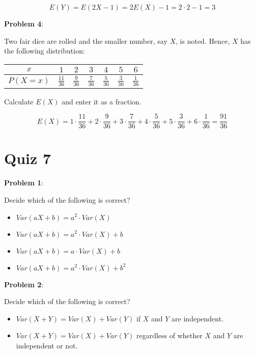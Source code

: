 \documentclass{article}
\begin{document}
{\color{blue}

$$E(Y)=E(2X-1)=2E(X)-1=2\cdot2-1=3$$

}

\noindent\textbf{Problem 4}:

Two fair dice are rolled and the smaller number, say $X$, is noted. Hence, $X$ has the following distribution:

\begin{center}
    \begin{tabular}{|c|c|c|c|c|c|c|}
        \hline
        $x$&$1$&$2$&$3$&$4$&$5$&$6$\\
        \hline
        $P(X=x)$&$\frac{11}{36}$&$\frac{9}{36}$&$\frac{7}{36}$&$\frac{5}{36}$&$\frac{3}{36}$&$\frac{1}{36}$\\
        \hline
    \end{tabular}
\end{center}

Calculate $E(X)$ and enter it as a fraction.

{\color{blue}

$$E(X)=1\cdot\frac{11}{36}+2\cdot\frac{9}{36}+3\cdot\frac{7}{36}+4\cdot\frac{5}{36}+5\cdot\frac{3}{36}+6\cdot\frac{1}{36}=\frac{91}{36}$$

}

\section{Quiz 7}

\noindent\textbf{Problem 1}:

Decide which of the following is correct?

\begin{itemize}
    \item {\color{blue}$Var(aX+b)=a^2\cdot Var(X)$}
    \item $Var(aX+b)=a^2\cdot Var(X)+b$
    \item $Var(aX+b)=a\cdot Var(X)+b$
    \item $Var(aX+b)=a^2\cdot Var(X)+b^2$
\end{itemize}

\noindent\textbf{Problem 2}:

Decide which of the following is correct?

\begin{itemize}
    \item {\color{blue}$Var(X+Y)=Var(X)+Var(Y)$ if $X$ and $Y$ are independent.}
    \item $Var(X+Y)=Var(X)+Var(Y)$ regardless of whether $X$ and $Y$ are independent or not.
\end{itemize}
\end{document}
